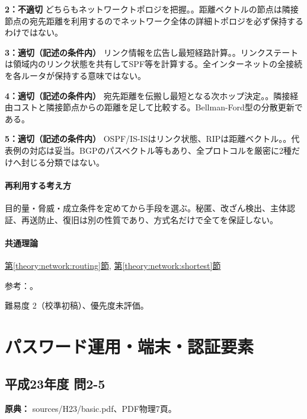 \noindent\textbf{2：不適切} どちらもネットワークトポロジを把握。。距離ベクトルの節点は隣接節点の宛先距離を利用するのでネットワーク全体の詳細トポロジを必ず保持するわけではない。\par

\noindent\textbf{3：適切（記述の条件内）} リンク情報を広告し最短経路計算。。リンクステートは領域内のリンク状態を共有してSPF等を計算する。全インターネットの全接続を各ルータが保持する意味ではない。\par

\noindent\textbf{4：適切（記述の条件内）} 宛先距離を伝搬し最短となる次ホップ決定。。隣接経由コストと隣接節点からの距離を足して比較する。Bellman-Ford型の分散更新である。\par

\noindent\textbf{5：適切（記述の条件内）} OSPF/IS-ISはリンク状態、RIPは距離ベクトル。。代表例の対応は妥当。BGPのパスベクトル等もあり、全プロトコルを厳密に2種だけへ封じる分類ではない。\par

\paragraph{再利用する考え方} 目的量・脅威・成立条件を定めてから手段を選ぶ。秘匿、改ざん検出、主体認証、再送防止、復旧は別の性質であり、方式名だけで全てを保証しない。

\paragraph{共通理論} \hyperref[theory:network:routing]{第\ref*{theory:network:routing}節}, \hyperref[theory:network:shortest]{第\ref*{theory:network:shortest}節}

\par 参考：\cite{net_ospf,net_rip}。

\par 難易度 2（校準初稿）、優先度未評価。

\section{パスワード運用・端末・認証要素}

\subsection{平成23年度 問2-5}
\label{q:h23-reg-basic-2-5}

\noindent\textbf{原典：} sources/H23/basic.pdf、PDF物理7頁。

